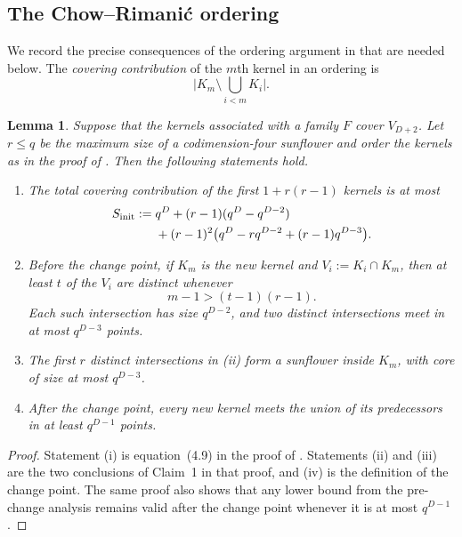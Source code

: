 \documentclass[11pt,reqno]{amsart}
\numberwithin{equation}{section}
\newtheorem{lemma}[lemma]{Lemma}
\theoremstyle{definition}
\theoremstyle{remark}
\newcommand{\cF}{\mathcal F}
\newcommand{\abs}[1]{\lvert#1\rvert}
\def\mathcal#1{#1}%
\begin{document}
\subsection{The Chow--Rimani\'c ordering}

We record the precise consequences of the ordering argument in
\cite[Section~4]{ChowRimanic} that are needed below.  The \emph{covering contribution} of the $m$th kernel in an ordering is
\[
 \abs{K_m\setminus\bigcup_{i<m}K_i}.
\]

\begin{lemma}\label{lem:CR-ordering}
Suppose that the kernels associated with a family $\cF$ cover $V_{D+2}$.  Let $r\le q$ be the maximum size of a codimension-four sunflower and order the kernels as in the proof of
\cite[Proposition~4.8]{ChowRimanic}.  Then the following statements hold.
\begin{enumerate}[label=\textup{(\roman*)}]
\item The total covering contribution of the first
$1+r(r-1)$ kernels is at most
\begin{align}
 S_{\mathrm{init}}:={}&q^D+(r-1)(q^D-q^{D-2})\notag\\
 &+(r-1)^2
 \bigl(q^D-rq^{D-2}+(r-1)q^{D-3}\bigr).
 \label{eq:S-init}
\end{align}
\item Before the change point, if $K_m$ is the new kernel and
$V_i:=K_i\cap K_m$, then at least $t$ of the $V_i$ are distinct whenever
\begin{equation}\label{eq:CR-pigeonhole}
 m-1>(t-1)(r-1).
\end{equation}
Each such intersection has size $q^{D-2}$, and two distinct intersections meet in at most $q^{D-3}$ points.
\item The first $r$ distinct intersections in \textup{(ii)} form a sunflower inside $K_m$, with core of size at most $q^{D-3}$.
\item After the change point, every new kernel meets the union of its predecessors in at least $q^{D-1}$ points.
\end{enumerate}
\end{lemma}

\begin{proof}
Statement \textup{(i)} is equation~(4.9) in the proof of
\cite[Proposition~4.8]{ChowRimanic}.  Statements \textup{(ii)} and \textup{(iii)} are the two conclusions of Claim~1 in that proof, and \textup{(iv)} is the definition of the change point.  The same proof also shows that any lower bound from the pre-change analysis remains valid after the change point whenever it is at most $q^{D-1}$.
\end{proof}
\end{document}
